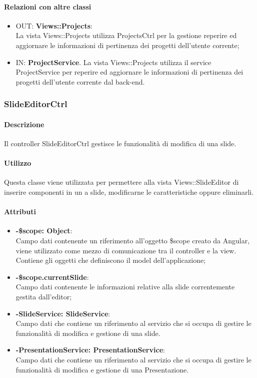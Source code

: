 	\paragraph{Relazioni con altre classi}
	\begin{itemize}
	  \item OUT: \textbf{Views::Projects}:\\
		La vista Views::Projects utilizza ProjectsCtrl per la gestione reperire ed aggiornare le informazioni di pertinenza dei progetti dell'utente corrente;	
	  \item IN: \textbf{ProjectService}.
		La vista Views::Projects utilizza il service ProjectService per reperire ed aggiornare le informazioni di pertinenza dei progetti dell'utente corrente dal back-end.
	\end{itemize}
	
\newpage
\subsubsection{SlideEditorCtrl}
	\paragraph{Descrizione}
	Il controller SlideEditorCtrl gestisce le funzionalità di modifica di una slide.
	
	\paragraph{Utilizzo}
	Questa classe viene utilizzata per permettere alla vista Views::SlideEditor di inserire componenti in un a slide, modificarne le caratteristiche oppure eliminarli.\\
	\paragraph{Attributi}
	\begin{itemize}
		\item \textbf{-\$scope: Object}:\\
			Campo dati contenente un riferimento all'oggetto \$scope creato da Angular, viene utilizzato come mezzo di comunicazione tra il controller e la view. Contiene gli oggetti che definiscono il model dell'applicazione;
		\item \textbf{-\$scope.currentSlide}:\\
			Campo dati contenente le informazioni relative alla slide correntemente gestita dall'editor;
		\item \textbf{-SlideService: SlideService}:\\
			Campo dati che contiene un riferimento al servizio che si occupa di gestire le funzionalità di modifica e gestione di una slide.
		\item \textbf{-PresentationService: PresentationService}:\\
			Campo dati che contiene un riferimento al servizio che si occupa di gestire le funzionalità di modifica e gestione di una Presentazione.
	\end{itemize}
	
